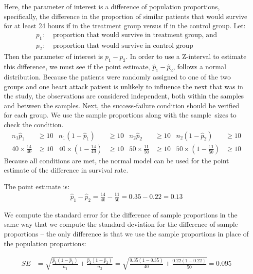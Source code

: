 Here, the parameter of interest is a difference of population proportions, specifically, the difference in the proportion of similar patients that would survive for at least 24 hours if in the treatment group versus if in the control group.  Let:
\begin{align*}
p_1:& \text{ proportion that would survive in treatment group, and} \\
p_2:& \text{ proportion that would survive in control group}
\end{align*}
Then the parameter of interest is $p_1 - p_2$.  In order to use a Z-interval to estimate this difference, we must see if the point estimate, $\hat{p}_{1} - \hat{p}_{2}$, follows a normal distribution.  Because the patients were randomly assigned to one of the two groups and one heart attack patient is unlikely to influence the next that was in the study, the observations are considered independent, both within the samples and between the samples.  Next, the success-failure condition should be verified for each group.  We use the sample proportions along with the sample~sizes to check the condition.
\begin{align*}
n_1\hat{p}_1&\ge 10 & n_1(1-\hat{p}_1)&\ge 10 & n_2\hat{p}_2&\ge 10 & n_2(1-\hat{p}_2)&\ge 10 \\
40 \times \frac{14}{40} &\ge 10
	&40 \times (1-\frac{14}{40}) &\ge 10
	&50 \times \frac{11}{50} &\ge 10
	&50 \times (1-\frac{11}{50}) &\ge 10
\end{align*}
Because all conditions are met, the normal model can be used for the point estimate of the difference in survival rate.

The point estimate is:
  \begin{align*}
  \hat{p}_{1} - \hat{p}_{2}
    = \frac{14}{40} - \frac{11}{50}
    = 0.35 - 0.22
    = 0.13
  \end{align*}

\D{\newpage}

We compute the standard error for the difference of sample proportions in the same way that we compute the standard deviation for the difference of sample proportions --  the only difference is that we use the sample proportions in place of the population proportions:

\begin{align*}
SE &= \sqrt{\frac{\hat{p}_1(1-\hat{p}_1)}{n_1} + \frac{\hat{p}_2(1-\hat{p}_2)}{n_2}}= \sqrt{\frac{0.35 (1 - 0.35)}{40} +
      \frac{0.22 (1 - 0.22)}{50}}
    = 0.095
  \end{align*}

